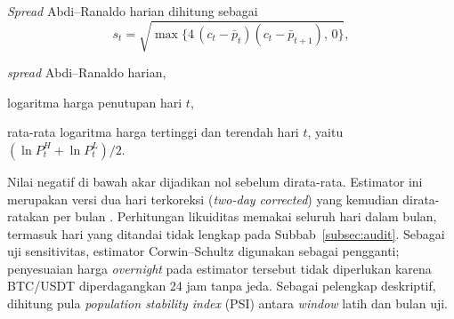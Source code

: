 \textit{Spread} Abdi--Ranaldo harian dihitung sebagai
\begin{equation}
  s_t = \sqrt{\max\{4\,(c_t - \bar{p}_t)(c_t - \bar{p}_{t+1}),\, 0\}},
  \label{eq:abdi}
\end{equation}
\begin{keterangan}
  \item[$s_t$] \textit{spread} Abdi--Ranaldo harian,
  \item[$c_t$] logaritma harga penutupan hari $t$,
  \item[$\bar{p}_t$] rata-rata logaritma harga tertinggi dan terendah hari
    $t$, yaitu $(\ln P^H_t + \ln P^L_t)/2$.
\end{keterangan}
Nilai negatif di bawah akar dijadikan nol sebelum
dirata-rata. Estimator ini merupakan versi dua hari terkoreksi
(\textit{two-day corrected}) yang kemudian dirata-ratakan per bulan
\cite{abdi2017}. Perhitungan likuiditas memakai seluruh hari dalam bulan,
termasuk hari yang ditandai tidak lengkap pada Subbab~\ref{subsec:audit}. Sebagai uji sensitivitas, estimator Corwin--Schultz
\cite{corwin2012} digunakan sebagai pengganti; penyesuaian harga
\textit{overnight} pada estimator tersebut tidak diperlukan karena BTC/USDT
diperdagangkan 24 jam tanpa jeda. Sebagai pelengkap deskriptif,
dihitung pula \textit{population stability index} (PSI) antara \textit{window}
latih dan bulan uji.

